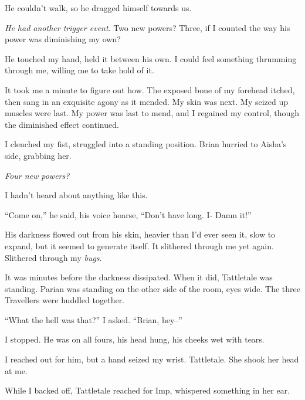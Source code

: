 He couldn't walk, so he dragged himself towards us.



\emph{He had another trigger event}.  Two new powers?  Three, if I counted the way his power was diminishing my own?



He touched my hand, held it between his own.  I could feel something thrumming through me, willing me to take hold of it.



It took me a minute to figure out how.  The exposed bone of my forehead itched, then sang in an exquisite agony as it mended.  My skin was next.  My seized up muscles were last.  My power was last to mend, and I regained my control, though the diminished effect continued.



I clenched my fist, struggled into a standing position.  Brian hurried to Aisha's side, grabbing her.



\emph{Four new powers?}



I hadn't heard about anything like this.



``Come on,'' he said, his voice hoarse, ``Don't have long.  I-  Damn it!''



His darkness flowed out from his skin, heavier than I'd ever seen it, slow to expand, but it seemed to generate itself.  It slithered through me yet again.  Slithered through my \emph{bugs}.



It was minutes before the darkness dissipated.  When it did, Tattletale was standing.  Parian was standing on the other side of the room, eyes wide.  The three Travellers were huddled together.



``What the hell was that?'' I asked.  ``Brian, hey--''



I stopped.  He was on all fours, his head hung, his cheeks wet with tears.



I reached out for him, but a hand seized my wrist.  Tattletale.  She shook her head at me.



While I backed off, Tattletale reached for Imp, whispered something in her ear.



